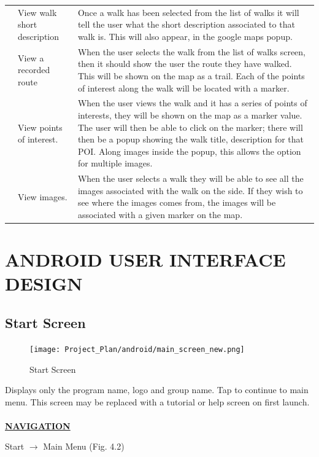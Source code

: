 \documentclass[12pt]{article}
\begin{document}
\begin{longtable}{|p{2cm}|p{3cm}|p{10cm}|}
\\\cline{2-3} & \multicolumn{1}{|p{3cm}|}{View walk short description}& \multicolumn{1}{|p{10cm}|}{Once a walk has been selected from the list of walks it will tell the user what the short description associated to that walk is. This will also appear, in the google maps popup.}
\\\cline{2-3} & \multicolumn{1}{|p{3cm}|}{View a recorded route}& \multicolumn{1}{|p{10cm}|}{When the user selects the walk from the list of walks screen, then it should show the user the route they have walked. This will be shown on the map as a trail. Each of the points of interest along the walk will be located with a marker.}
\\\cline{2-3} & \multicolumn{1}{|p{3cm}|}{View points of interest.}& \multicolumn{1}{|p{10cm}|}{When the user views the walk and it has a series of points of interests, they will be shown on the map as a marker value. The user will then be able to click on the marker; there will then be a popup showing the walk title, description for that POI. Along images inside the popup, this allows the option for multiple images.}
\\\cline{2-3} & \multicolumn{1}{|p{3cm}|}{View images.}& \multicolumn{1}{|p{10cm}|}{When the user selects a walk they will be able to see all the images associated with the walk on the side. If they wish to see where the images comes from, the images will be associated with a given marker on the map.}
\\\hline
\end{longtable}
\newpage
\section{ANDROID USER INTERFACE DESIGN}
\subsection{Start Screen}
\begin{figure}[htp]
\centering
\texttt{[image: Project\_Plan/android/main\_screen\_new.png]}
\caption{Start Screen}
\label{Start Screen}
\end{figure}
Displays only the program name, logo and group name. Tap to continue to main menu. This screen may be replaced with a tutorial or help screen on first launch. \\\\
\textbf{\uline{NAVIGATION}}
\par{Start $\rightarrow$ Main Menu (Fig. 4.2)} 
\clearpage
\end{document}
